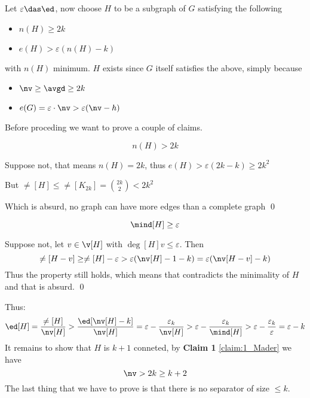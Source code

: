 \begin{prf}
    Let $\varepsilon \das \ed$, now choose $H$ to be a subgraph of $G$ satisfying the following
    \begin{itemize}
        \item $n(H) \geq 2k$
        \item $e(H) > \varepsilon(n(H) - k)$
    \end{itemize}
    with $n(H)$ minimum. $H$ exists since $G$ itself satisfies the above, simply because
    \begin{itemize}
        \item $\nv \geq \avgd \geq 2k$
        \item $e(G) = \varepsilon \cdot \nv > \varepsilon (\nv - h)$
    \end{itemize}
    Before proceding we want to prove a couple of claims.
    \begin{claim}
        \label{claim:1_Mader}
        \begin{equation*}
            n(H) > 2k
        \end{equation*}
    \end{claim}
    \begin{prf}
        Suppose not, that means $n(H) = 2k$, thus $e(H) > \varepsilon(2k - k) \geq 2k^2$

        But $\ne[H] \leq \ne[K_{2k}] = \binom{2k}{2} < 2k^2$

        Which is absurd, no graph can have more edges than a complete graph \qed
    \end{prf}
    \begin{claim}
        \label{claim:2_Mader}
        \begin{equation*}
            \mind[H] \geq \varepsilon
        \end{equation*}
    \end{claim}
    \begin{prf}
        Suppose not, let $v \in \v[H]$ with $\deg[H]{v} \leq \varepsilon$. Then 
        \begin{equation*}
            \ne[H - v] \geq \ne[H] - \varepsilon > \varepsilon(\nv[H] - 1 - k) = \varepsilon(\nv[H - v] - k)
        \end{equation*}
        Thus the property still holds, which means that contradicts the minimality of $H$ and that is absurd. \qed
    \end{prf}
    Thus:
    \begin{equation*}
        \ed[H] = \frac{\ne[H]}{\nv[H]} > \frac{\ed[\nv[H] - k]}{\nv[H]} = \varepsilon - \frac{\varepsilon_k}{\nv[H]} > \varepsilon - \frac{\varepsilon_k}{\mind[H]} > \varepsilon - \frac{\varepsilon_k}{\varepsilon} = \varepsilon - k
    \end{equation*}
    It remains to show that $H$ is $k + 1$ conneted, by \textbf{Claim 1} \ref{claim:1_Mader} we have
    \begin{equation*}
        \nv > 2k \geq k + 2
    \end{equation*}
    The last thing that we have to prove is that there is no separator of size $\leq k$.


\end{prf}
